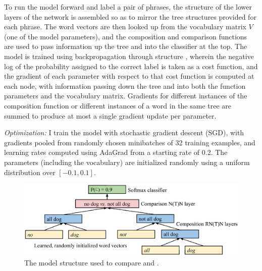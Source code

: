 To run the model forward and label a pair of phrases, the structure of the lower layers of the network is assembled so as to mirror the tree structures provided for each phrase. The word vectors are then looked up from the vocabulary matrix $V$ (one of the model parameters), and the composition and comparison functions are used to pass information up the tree and into the classifier at the top. The model is trained using backpropagation through structure  \cite{goller1996learning}, wherein the negative log of the probability assigned to the correct label is taken as a cost function, and the gradient of each parameter with respect to that cost function is computed at each node, with information passing down the tree and into both the function parameters and the vocabulary matrix. Gradients for different instances of the composition function or different instances of a word in the same tree are summed to produce at most a single gradient update per parameter.

\textit{Optimization:} I train the model with stochastic gradient descent (SGD), with gradients pooled from randomly chosen minibatches of 32 training examples, and learning rates computed using AdaGrad \cite{duchi2011adaptive} from a starting rate of 0.2. The parameters (including the vocabulary) are initialized randomly using a uniform distribution over $[-0.1, 0.1]$. %

\begin{figure}
\begin{center}
\includegraphics[scale=0.36]{model.eps}
\end{center}
\caption{The model structure used to compare  and . \label{sample-figure}} 
\end{figure} %

